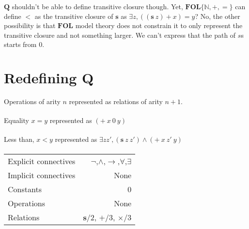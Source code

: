 \documentclass{article}
\begin{document}
$\mathbf{Q}$ shouldn't be able to define transitive closure though. Yet, $\mathbf{FOL}\{\mathbb{N},+, = \}$ can define $<$ as the transitive closure of $\mathbf{s}$ as $\exists z , ((\mathbf{s}\ z) + x) = y$? No, the other possibility is that $\mathbf{FOL}$ model theory does not constrain it to only represent the transitive closure and not something larger. We can't express that the path of $s$s starts from $0$.

\newpage
\section{Redefining Q}
\paragraph{}
Operations of arity $n$ represented as relations of arity $n+1$.
\paragraph{}
Equality $x = y$ represented as $(+\ x\ 0\ y)$
\paragraph{}
Less than, $x < y$ represented as $\exists z z', (\mathbf{s}\ z\ z') \land (+\ x\ z'\ y)$

\paragraph{}

\begin{tabular}{l | r}
 \hline
 Explicit connectives & $\neg$,$\land$,$\rightarrow $,$\forall$,$\exists$ \\
 Implicit connectives & None \\
 Constants & 0 \\
 Operations & None \\
 Relations & $\mathbf{s}$/2, $+$/3, $\times$/3\\
 \hline
\end{tabular}
\end{document}
